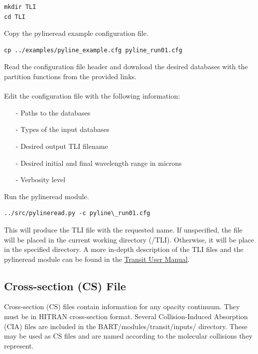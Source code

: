 \documentclass[letterpaper, 12pt]{article}
\begin{document}
\begin{verbatim}
mkdir TLI
cd TLI
\end{verbatim}

\noindent
Copy the pylineread example configuration file.

\begin{verbatim}
cp ../examples/pyline_example.cfg pyline_run01.cfg
\end{verbatim}

\noindent
Read the configuration file header and download the desired databases with the partition functions from the provided links.\\
\\
\noindent
Edit the configuration file with the following information:

\begin{enumerate}
\item[-] Paths to the databases
\item[-] Types of the input databases
\item[-] Desired output TLI filename
\item[-] Desired initial and final wavelength range in microns
\item[-] Verbosity level
\end{enumerate}

\noindent
Run the pylineread module.

\begin{verbatim}
../src/pylineread.py -c pyline\_run01.cfg
\end{verbatim}

\noindent
This will produce the TLI file with the requested name. If unspecified, the file will be placed in the current working directory (/TLI). Otherwise, it will be place in the specified directory. A more in-depth description of the TLI files and the pylineread module can be found in the \href{https://exosports.github.io/transit/doc/Transit_User_Manual.html}{Transit User Manual}.


\subsection{Cross-section (CS) File}
\label{sec:CS}
Cross-section (CS) files contain information for any opacity continuum. They must be in HITRAN cross-section format. Several Collision-Induced Absorption (CIA) files are included in the BART/modules/transit/inputs/ directory. These may be used as CS files and are named according to the molecular collisions they represent.
\end{document}
